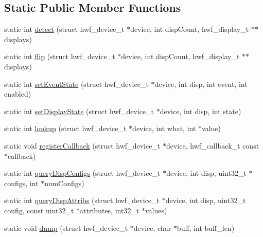 \subsection*{Static Public Member Functions}
\begin{DoxyCompactItemize}
\item 
static int \mbox{\hyperlink{structhwcomposer_1_1HwfDevice_a5bd285f65735f896968db942ca18f22b}{detect}} (struct hwf\+\_\+device\+\_\+t $\ast$device, int disp\+Count, hwf\+\_\+display\+\_\+t $\ast$$\ast$displays)
\item 
static int \mbox{\hyperlink{structhwcomposer_1_1HwfDevice_a17f2fc575a1c6228cc6f5747fadbe065}{flip}} (struct hwf\+\_\+device\+\_\+t $\ast$device, int disp\+Count, hwf\+\_\+display\+\_\+t $\ast$$\ast$displays)
\item 
static int \mbox{\hyperlink{structhwcomposer_1_1HwfDevice_aa1f6362cd358f5a2cc87d7ccfdad5af5}{set\+Event\+State}} (struct hwf\+\_\+device\+\_\+t $\ast$device, int disp, int event, int enabled)
\item 
static int \mbox{\hyperlink{structhwcomposer_1_1HwfDevice_adb550a7520ececbd89da42098cd6e461}{set\+Display\+State}} (struct hwf\+\_\+device\+\_\+t $\ast$device, int disp, int state)
\item 
static int \mbox{\hyperlink{structhwcomposer_1_1HwfDevice_aa9ceccea3b836aa5abf8fbf2a36ce280}{lookup}} (struct hwf\+\_\+device\+\_\+t $\ast$device, int what, int $\ast$value)
\item 
static void \mbox{\hyperlink{structhwcomposer_1_1HwfDevice_a3c68e078ccdf371b51b04c095d51eb57}{register\+Callback}} (struct hwf\+\_\+device\+\_\+t $\ast$device, hwf\+\_\+callback\+\_\+t const $\ast$callback)
\item 
static int \mbox{\hyperlink{structhwcomposer_1_1HwfDevice_ae706c9f4d8a292f6f3e98a15c9b13cfc}{query\+Disp\+Configs}} (struct hwf\+\_\+device\+\_\+t $\ast$device, int disp, uint32\+\_\+t $\ast$configs, int $\ast$num\+Configs)
\item 
static int \mbox{\hyperlink{structhwcomposer_1_1HwfDevice_a13d2160d0425e6336c4501e95581de01}{query\+Disp\+Attribs}} (struct hwf\+\_\+device\+\_\+t $\ast$device, int disp, uint32\+\_\+t config, const uint32\+\_\+t $\ast$attributes, int32\+\_\+t $\ast$values)
\item 
static void \mbox{\hyperlink{structhwcomposer_1_1HwfDevice_a356a08f9f098807ddccd2ea1fd3c71e2}{dump}} (struct hwf\+\_\+device\+\_\+t $\ast$device, char $\ast$buff, int buff\+\_\+len)
\end{DoxyCompactItemize}
